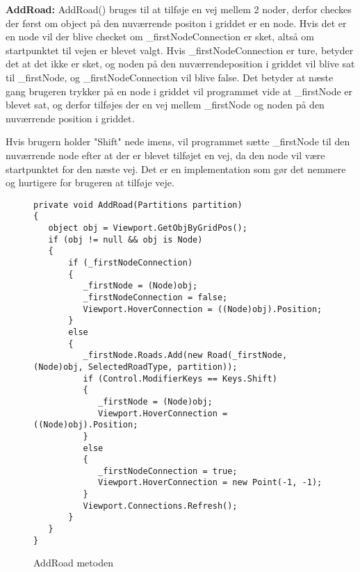 \vspace{5mm}


\textbf{AddRoad:} \newline
AddRoad() bruges til at tilføje en vej mellem 2 noder, derfor checkes der først om object på den nuværrende positon i griddet er en node. Hvis det er en node vil der blive checket om \_firstNodeConnection er sket, altså om startpunktet til vejen er blevet valgt. Hvis \_firstNodeConnection er ture, betyder det at det ikke er sket, og noden på den nuværrendeposition i griddet vil blive sat til \_firstNode, og \_firstNodeConnection vil blive false. Det betyder at næste gang brugeren trykker på en node i griddet vil programmet vide at \_firstNode er blevet sat, og derfor tilføjes der en vej mellem \_firstNode og noden på den nuværrende position i griddet.

Hvis brugern holder "Shift" nede imens, vil programmet sætte \_firstNode til den nuværrende node efter at der er blevet tilføjet en vej, da den node vil være startpunktet for den næste vej. Det er en implementation som gør det nemmere og hurtigere for brugeren at tilføje veje. 


\begin{figure}[H]
\begin{lstlisting}
private void AddRoad(Partitions partition)
{
   object obj = Viewport.GetObjByGridPos();
   if (obj != null && obj is Node)
   {
       if (_firstNodeConnection)
       {
          _firstNode = (Node)obj;
          _firstNodeConnection = false;
          Viewport.HoverConnection = ((Node)obj).Position;
       }
       else
       {
          _firstNode.Roads.Add(new Road(_firstNode, (Node)obj, SelectedRoadType, partition));
          if (Control.ModifierKeys == Keys.Shift)
          {
             _firstNode = (Node)obj;
             Viewport.HoverConnection = ((Node)obj).Position;
          }
          else
          {
             _firstNodeConnection = true;
             Viewport.HoverConnection = new Point(-1, -1);
          }
          Viewport.Connections.Refresh();
       }
   }
}
\end{lstlisting}
\caption{AddRoad metoden}\label{AddRoadCode}
\end{figure}



















